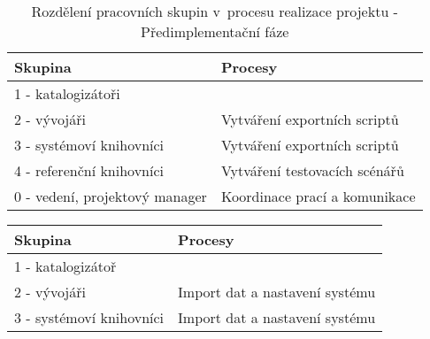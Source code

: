 \documentclass[
	11pt, oneside, printed, draft, 
	table,   %
	lof,     %
	lot     %
]{fithesis3}
\newcommand{\bold}[1]{\textbf{#1}}
\begin{document}
{\begin{table}[c]
    \centering
    \begin{tabular}{| p{3cm} | p{8.3cm} |}
    \hline
    \bold{Skupina} 	
    & 
    \bold{Procesy} 
    \\ \hline
    
	1 - katalogizátoři
    & 
    
    \\ \hline
    
	2 - vývojáři
    & 
    Vytváření exportních scriptů
    \\ \hline
    
	3 - systémoví knihovníci
    & 
    Vytváření exportních scriptů
    \\ \hline
    
	4 - referenční knihovníci
    & 
    Vytváření testovacích scénářů
    \\ \hline
    
	0 - vedení, projektový manager
    & 
    Koordinace prací a komunikace
    \\ \hline
    
    \end{tabular}
    \caption{Rozdělení pracovních skupin v~procesu realizace projektu - Předimplementační fáze}
\end{table}
    
\begin{table}[c]
    \centering
    \begin{tabular}{| p{3cm} | p{8.3cm} |}
    \hline
    \bold{Skupina} 	
    & 
    \bold{Procesy} 
    \\ \hline
    
	1 - katalogizátoř
    & 
    
    \\ \hline
    
	2 - vývojáři
    & 
    Import dat a nastavení systému
    \\ \hline
    
	3 - systémoví knihovníci
    & 
    Import dat a nastavení systému
    \\ \hline
    

\end{tabular}
\end{table}}
\end{document}
